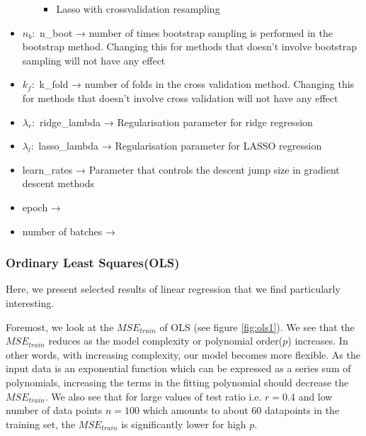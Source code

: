 \begin{itemize}
\begin{itemize}
\begin{itemize}
            \item Lasso with crossvalidation resampling
        \end{itemize}
    \end{itemize}
    \item $n_b:$  n\_boot → number of times bootstrap sampling is performed in the bootstrap method. Changing this for methods that doesn't involve bootstrap sampling will not have any effect
    \item $k_f:$  k\_fold → number of folds in the cross validation method. Changing this for methods that doesn't involve cross validation will not have any effect
    \item $\lambda_r:$  ridge\_lambda → Regularisation parameter for ridge regression
    \item $\lambda_l:$ lasso\_lambda → Regularisation parameter for LASSO regression
    \item learn\_rates → Parameter that controls the descent jump size in gradient descent methods
    \item epoch →
    \item number of batches →
\end{itemize}

\subsubsection{Ordinary Least Squares(OLS)}

Here, we present selected results of linear regression that we find particularly interesting.

Foremost, we look at the $MSE_{train}$ of OLS (see figure \ref{fig:ols1}). We see that the $MSE_{train}$ reduces as the model complexity or polynomial order($p$) increases. In other words, with increasing complexity, our model becomes more flexible. As the input data is an exponential function which can be expressed as a series sum of polynomials, increasing the terms in the fitting polynomial should decrease the $MSE_{train}$. We also see that for large values of test ratio i.e. $r = 0.4$ and low number of data points $n = 100$ which amounts to about $60$ datapoints in the training set, the $MSE_{train}$ is significantly lower for high $p$.

